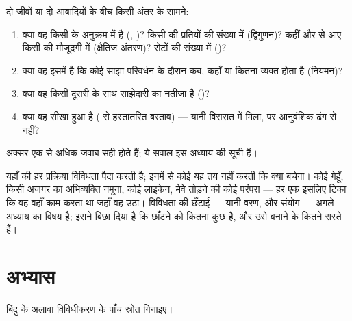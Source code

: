 \begin{method}[किसी अंतर के स्रोत का नाम लेना]\label{met:g12:diversification-of-life:name}
दो जीवों या दो आबादियों के बीच किसी अंतर के सामने:
\begin{enumerate}
  \item क्या वह किसी  के अनुक्रम में है (, )?
        किसी  की प्रतियों की संख्या में (द्विगुणन)? कहीं और से आए किसी
         की मौजूदगी में (क्षैतिज अंतरण)?  सेटों की संख्या में
        ()?
  \item क्या वह इसमें है कि कोई साझा  परिवर्धन के दौरान कब, कहाँ या
        कितना व्यक्त होता है (नियमन)?
  \item क्या वह किसी दूसरी  के साथ साझेदारी का नतीजा है ()?
  \item क्या वह सीखा हुआ है ( से हस्तांतरित बरताव) --- यानी
        विरासत में मिला, पर आनुवंशिक ढंग से नहीं?
\end{enumerate}
अक्सर एक से अधिक जवाब सही होते हैं; ये सवाल इस अध्याय की सूची हैं।
\end{method}

\begin{remark}\label{rem:g12:diversification-of-life:selection}
यहाँ की हर प्रक्रिया विविधता पैदा करती है; इनमें से कोई यह तय नहीं करती कि
क्या बचेगा। कोई  गेहूँ, किसी अजगर का अभिव्यक्ति नमूना, कोई लाइकेन,
मेवे तोड़ने की कोई परंपरा --- हर एक इसलिए टिका कि वह वहाँ काम करता था जहाँ
वह उठा। विविधता की छँटाई --- यानी वरण, और संयोग --- अगले अध्याय का विषय है;
इसने बिछा दिया है कि छाँटने को कितना कुछ है, और उसे बनाने के कितने रास्ते
हैं।
\end{remark}

\section{अभ्यास}

\begin{exercise}[$\star$]\label{exo:g12:diversification-of-life:1}
बिंदु  के अलावा विविधीकरण के पाँच स्रोत गिनाइए।
\end{exercise}

